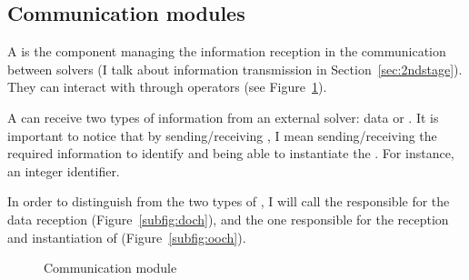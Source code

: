 \subsection{Communication modules}


A \opch{} is the component managing the information reception in the communication between solvers (I talk about information transmission in Section~\ref{sec:2ndstage}). They can interact with \oms{} through operators (see Figure~\ref{fig:och}).

A \opch{} can receive two types of information from an external solver: data or \oms{}. It is important to notice that by sending/receiving \oms, I mean sending/receiving the required information to identify and being able to instantiate the \om. For instance, an integer identifier.

In order to distinguish from the two types of \opchs, I will call \INTROdopch{} the \opch{} responsible for the data reception (Figure~\ref{subfig:doch}), and \INTROoopch{} the one responsible for the reception and instantiation of \oms{} (Figure~\ref{subfig:ooch}).


%

\begin{figure}
	\centering
	\hspace{0.05\textwidth}%
	\caption[]{Communication module}
	\label{fig:och}
\end{figure}

